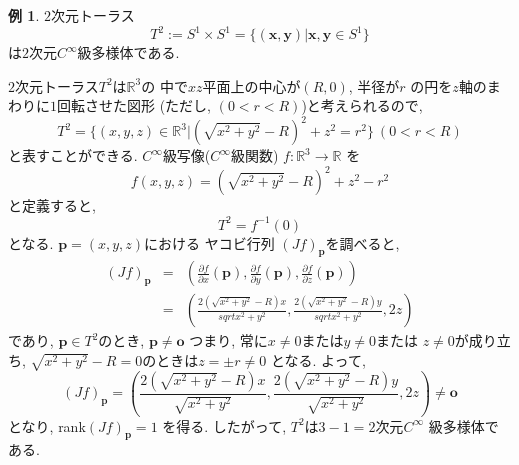 \documentclass[a4j,12pt]{jarticle}
\theoremstyle{definition}
\newtheorem{example}[theorem]{例}
\begin{document}
\begin{example}
    $2$次元トーラス
    $$T^2:=S^1\times S^1=
    \{(\boldsymbol{x},\boldsymbol{y})|
    \boldsymbol{x},\boldsymbol{y}\in S^1\}$$
    は$2$次元$C^\infty$級多様体である. 

    $2$次元トーラス$T^2$は$\mathbb{R}^3$の
    中で$xz$平面上の中心が$(R,0)$, 半径が$r$
    の円を$z$軸のまわりに$1$回転させた図形
    (ただし, $(0<r<R)$)と考えられるので, 
    $$T^2=\{(x,y,z)\in \mathbb{R}^3|
    (\sqrt{x^2+y^2}-R)^2+z^2=r^2\}\ (0<r<R)$$
    と表すことができる. 
    $C^\infty$級写像($C^\infty$級関数)
    $f:\mathbb{R}^3\to \mathbb{R}$
    を
    $$f(x,y,z)=(\sqrt{x^2+y^2}-R)^2+z^2-r^2$$
    と定義すると, 
    $$T^2=f^{-1}(0)$$
    となる. $\boldsymbol{p}=(x,y,z)$における
    ヤコビ行列
    $(Jf)_{\boldsymbol{p}}$を調べると, 
    \begin{eqnarray*}
        (Jf)_{\boldsymbol{p}}&=&
        \left(\frac{\partial f}{\partial x}
        (\boldsymbol{p}), \frac{\partial f}{\partial y}
        (\boldsymbol{p}), \frac{\partial f}{\partial z}
        (\boldsymbol{p})\right)\\
        &=&
        \left(\frac{2(\sqrt{x^2+y^2}-R)x}
        {sqrt{x^2+y^2}},\frac{2(\sqrt{x^2+y^2}-R)y}
        {sqrt{x^2+y^2}},2z\right)
    \end{eqnarray*}
    であり, $\boldsymbol{p}\in T^2$のとき, 
    $\boldsymbol{p}\neq \boldsymbol{o}$
    つまり, 常に$x\neq 0$または$y\neq 0$または
    $z\neq 0$が成り立ち, 
    $\sqrt{x^2+y^2}-R=0$のときは$z=\pm r\neq 0$
    となる. よって, 
    $$(Jf)_{\boldsymbol{p}}=
    \left(\frac{2(\sqrt{x^2+y^2}-R)x}
        {\sqrt{x^2+y^2}},\frac{2(\sqrt{x^2+y^2}-R)y}
        {\sqrt{x^2+y^2}},2z\right)\neq 
        \boldsymbol{o}$$
    となり, rank$(Jf)_{\boldsymbol{p}}=1$
    を得る. 
    したがって, $T^2$は$3-1=2$次元$C^\infty$
    級多様体である. 
\end{example}
\end{document}
